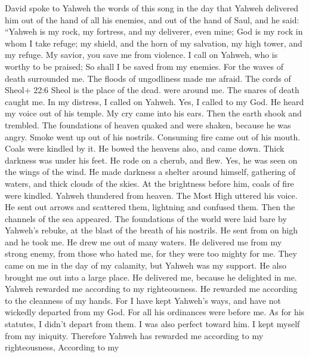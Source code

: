  David spoke to Yahweh the words of this song in the day
that Yahweh delivered him out of the hand of all his enemies, and out of
the hand of Saul,  and he said: ``Yahweh is my rock, my
fortress, and my deliverer, even mine;  God is my rock in
whom I take refuge; my shield, and the horn of my salvation, my high
tower, and my refuge. My savior, you save me from violence. 
I call on Yahweh, who is worthy to be praised; So shall I be saved from
my enemies.  For the waves of death surrounded me. The
floods of ungodliness made me afraid.  The cords of Sheol+
22:6 Sheol is the place of the dead. were around me. The snares of death
caught me.  In my distress, I called on Yahweh. Yes, I
called to my God. He heard my voice out of his temple. My cry came into
his ears.  Then the earth shook and trembled. The
foundations of heaven quaked and were shaken, because he was angry.
 Smoke went up out of his nostrils. Consuming fire came out
of his mouth. Coals were kindled by it.  He bowed the
heavens also, and came down. Thick darkness was under his feet.
 He rode on a cherub, and flew. Yes, he was seen on the
wings of the wind.  He made darkness a shelter around
himself, gathering of waters, and thick clouds of the skies.
 At the brightness before him, coals of fire were kindled.
 Yahweh thundered from heaven. The Most High uttered his
voice.  He sent out arrows and scattered them, lightning
and confused them.  Then the channels of the sea appeared.
The foundations of the world were laid bare by Yahweh's rebuke, at the
blast of the breath of his nostrils.  He sent from on high
and he took me. He drew me out of many waters.  He
delivered me from my strong enemy, from those who hated me, for they
were too mighty for me.  They came on me in the day of my
calamity, but Yahweh was my support.  He also brought me
out into a large place. He delivered me, because he delighted in me.
 Yahweh rewarded me according to my righteousness. He
rewarded me according to the cleanness of my hands.  For I
have kept Yahweh's ways, and have not wickedly departed from my God.
 For all his ordinances were before me. As for his
statutes, I didn't depart from them.  I was also perfect
toward him. I kept myself from my iniquity.  Therefore
Yahweh has rewarded me according to my righteousness, According to my

